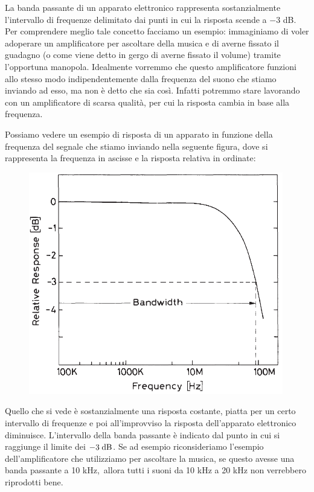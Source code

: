 La banda passante di un apparato elettronico rappresenta sostanzialmente l'intervallo di frequenze delimitato dai punti in cui la risposta scende a $-3$ dB. Per comprendere meglio tale concetto facciamo un esempio: immaginiamo di voler adoperare un amplificatore per ascoltare della musica e di averne fissato il guadagno (o come viene detto in gergo di averne fissato il volume) tramite l'opportuna manopola. Idealmente vorremmo che questo amplificatore funzioni allo stesso modo indipendentemente dalla frequenza del suono che stiamo inviando ad esso, ma non è detto che sia così. Infatti potremmo stare lavorando con un amplificatore di scarsa qualità, per cui la risposta cambia in base alla frequenza.

Possiamo vedere un esempio di risposta di un apparato in funzione della frequenza del segnale che stiamo inviando nella seguente figura, dove si rappresenta la frequenza in ascisse e la risposta relativa in ordinate:

\begin{minipage}{0.45\textwidth}
   \begin{figure}[H]
      \includegraphics[width=0.99\textwidth]{immagini/banda_passante.png}
   \end{figure}
\end{minipage}
\begin{minipage}{0.54\textwidth}
   Quello che si vede è sostanzialmente una risposta costante, piatta per un certo intervallo di frequenze e poi all'improvviso la risposta dell'apparato elettronico diminuisce. L'intervallo della banda passante è indicato dal punto in cui si raggiunge il limite dei $-3 \; \rm dB$. Se ad esempio riconsideriamo l'esempio dell'amplificatore che utilizziamo per ascoltare la musica, se questo avesse una banda passante a 10 kHz,\footnotemark\, allora tutti i suoni da 10 kHz a 20 kHz non verrebbero riprodotti bene.
\end{minipage}

